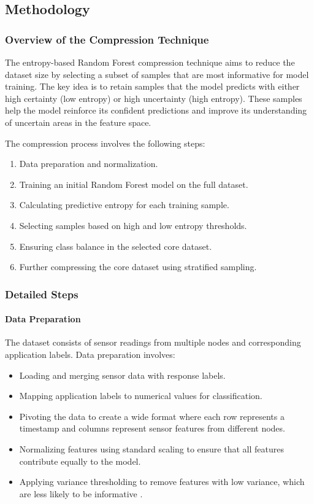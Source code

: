 \documentclass{article}
\begin{document}
\subsection{Methodology}

\subsubsection{Overview of the Compression Technique}

The entropy-based Random Forest compression technique aims to reduce the dataset size by selecting a subset of samples that are most informative for model training. The key idea is to retain samples that the model predicts with either high certainty (low entropy) or high uncertainty (high entropy). These samples help the model reinforce its confident predictions and improve its understanding of uncertain areas in the feature space.

The compression process involves the following steps:

\begin{enumerate}
    \item Data preparation and normalization.
    \item Training an initial Random Forest model on the full dataset.
    \item Calculating predictive entropy for each training sample.
    \item Selecting samples based on high and low entropy thresholds.
    \item Ensuring class balance in the selected core dataset.
    \item Further compressing the core dataset using stratified sampling.
\end{enumerate}

\subsubsection{Detailed Steps}

\paragraph{Data Preparation}

The dataset consists of sensor readings from multiple nodes and corresponding application labels. Data preparation involves:

\begin{itemize}
    \item Loading and merging sensor data with response labels.
    \item Mapping application labels to numerical values for classification.
    \item Pivoting the data to create a wide format where each row represents a timestamp and columns represent sensor features from different nodes.
    \item Normalizing features using standard scaling to ensure that all features contribute equally to the model.
    \item Applying variance thresholding to remove features with low variance, which are less likely to be informative \cite{diaz2006gene}.
\end{itemize}
\end{document}
